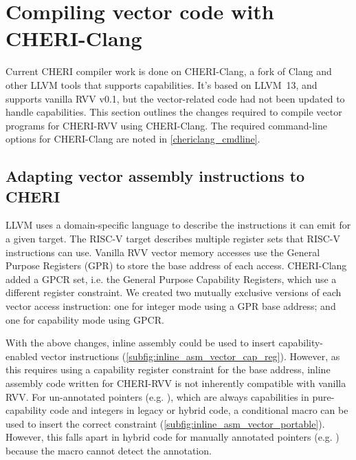 \documentclass[../thesis]{subfiles}
\begin{document}
\pagebreak
\section{Compiling vector code with CHERI-Clang}\label{chap:software:sec:chericlang}
Current CHERI compiler work is done on CHERI-Clang, a fork of Clang and other LLVM tools that supports capabilities.
It's based on LLVM~13, and supports vanilla RVV v0.1, but the vector-related code had not been updated to handle capabilities.
This section outlines the changes required to compile vector programs for CHERI-RVV using CHERI-Clang.
The required command-line options for CHERI-Clang are noted in \cref{chericlang_cmdline}.

\subsection{Adapting vector assembly instructions to CHERI}\label{addingtochericlang}
LLVM uses a domain-specific language to describe the instructions it can emit for a given target.
The RISC-V target describes multiple register sets that RISC-V instructions can use.
Vanilla RVV vector memory accesses use the General Purpose Registers (GPR) to store the base address of each access.
CHERI-Clang added a GPCR set, i.e. the General Purpose Capability Registers, which use a different register constraint.
We created two mutually exclusive versions of each vector access instruction: one for integer mode using a GPR base address; and one for capability mode using GPCR.

With the above changes, inline assembly could be used to insert capability-enabled vector instructions (\cref{subfig:inline_asm_vector_cap_reg}).
However, as this requires using a capability register constraint for the base address, inline assembly code written for CHERI-RVV is not inherently compatible with vanilla RVV.
For un-annotated pointers (e.g. ), which are always capabilities in pure-capability code and integers in legacy or hybrid code, a conditional macro can be used to insert the correct constraint (\cref{subfig:inline_asm_vector_portable}).
However, this falls apart in hybrid code for manually annotated pointers (e.g. ) because the macro cannot detect the annotation.
\end{document}
